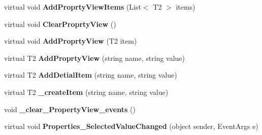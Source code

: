 \begin{DoxyCompactItemize}
\item 
\hypertarget{classlib_watcher_dialog_1_1_property_form_3_01_t_00_01_t2_01_4_a7ac8f87144e690e5d684ba83148f1c85}{virtual void {\bfseries Add\+Proprty\+View\+Items} (List$<$ T2 $>$ items)}\label{classlib_watcher_dialog_1_1_property_form_3_01_t_00_01_t2_01_4_a7ac8f87144e690e5d684ba83148f1c85}

\item 
\hypertarget{classlib_watcher_dialog_1_1_property_form_3_01_t_00_01_t2_01_4_ac1d58bde257b20b85ce8d20f929e519e}{virtual void {\bfseries Clear\+Proprty\+View} ()}\label{classlib_watcher_dialog_1_1_property_form_3_01_t_00_01_t2_01_4_ac1d58bde257b20b85ce8d20f929e519e}

\item 
\hypertarget{classlib_watcher_dialog_1_1_property_form_3_01_t_00_01_t2_01_4_a868916474fdf697dc008b1f916486d03}{virtual void {\bfseries Add\+Proprty\+View} (T2 item)}\label{classlib_watcher_dialog_1_1_property_form_3_01_t_00_01_t2_01_4_a868916474fdf697dc008b1f916486d03}

\item 
\hypertarget{classlib_watcher_dialog_1_1_property_form_3_01_t_00_01_t2_01_4_a1aef903e9d5b981bd9fe6a37a398e4ad}{virtual T2 {\bfseries Add\+Proprty\+View} (string name, string value)}\label{classlib_watcher_dialog_1_1_property_form_3_01_t_00_01_t2_01_4_a1aef903e9d5b981bd9fe6a37a398e4ad}

\item 
\hypertarget{classlib_watcher_dialog_1_1_property_form_3_01_t_00_01_t2_01_4_aa18e9e3a8f2e818ae99f6db1462a8ac1}{virtual T2 {\bfseries Add\+Detial\+Item} (string name, string value)}\label{classlib_watcher_dialog_1_1_property_form_3_01_t_00_01_t2_01_4_aa18e9e3a8f2e818ae99f6db1462a8ac1}

\item 
\hypertarget{classlib_watcher_dialog_1_1_property_form_3_01_t_00_01_t2_01_4_a6c358d53363a1e096b4d1a197966bffe}{virtual T2 {\bfseries \+\_\+create\+Item} (string name, string value)}\label{classlib_watcher_dialog_1_1_property_form_3_01_t_00_01_t2_01_4_a6c358d53363a1e096b4d1a197966bffe}

\item 
\hypertarget{classlib_watcher_dialog_1_1_property_form_3_01_t_00_01_t2_01_4_adac74c6fdf7710eae475d9bdfddd8fe1}{void {\bfseries \+\_\+clear\+\_\+\+Property\+View\+\_\+events} ()}\label{classlib_watcher_dialog_1_1_property_form_3_01_t_00_01_t2_01_4_adac74c6fdf7710eae475d9bdfddd8fe1}

\item 
\hypertarget{classlib_watcher_dialog_1_1_property_form_3_01_t_00_01_t2_01_4_a3a2af271430e5aceeb3a4cc7b7ac3ded}{virtual void {\bfseries Properties\+\_\+\+Selected\+Value\+Changed} (object sender, Event\+Args e)}\label{classlib_watcher_dialog_1_1_property_form_3_01_t_00_01_t2_01_4_a3a2af271430e5aceeb3a4cc7b7ac3ded}


\end{DoxyCompactItemize}
